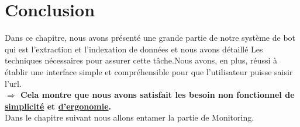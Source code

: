 \section*{Conclusion}
\normalsize Dans ce chapitre, nous avons présenté  une grande partie de notre système de bot qui est l’extraction et l'indexation de données et nous avons détaillé Les techniques nécessaires pour assurer cette tâche.Nous avons, en plus, réussi à établir une interface simple et compréhensible pour que l'utilisateur puisse saisir l'url. \\
\noindent\textbf{$\Rightarrow$ Cela montre que nous avons satisfait les besoin non fonctionnel de \underline{simplicité} et \underline{d'ergonomie}.}\\
Dans le chapitre suivant nous allons entamer la partie de Monitoring.